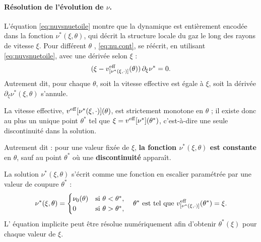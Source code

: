 \paragraph{Résolution de l'évolution de $\nu$.} L'équation \eqref{eq:nuvsnuetoile} montre que la dynamique est  entièrement encodée dans la fonction $\nu^*(\xi,\theta)$, qui décrit la structure locale du gaz le long des rayons de vitesse $\xi$. Pour différent  $\theta$ , \eqref{eq:nu.cont},  se réécrit, en utilisant \eqref{eq:nuvsnuetoile},   avec une dérivée selon $\xi$ : 
\begin{equation}
	( \xi - v^{\rm eff}_{[\nu^\ast(\xi,\cdot )  ]}(\theta) )\, \partial_\xi \nu^\ast  = 0 .	
\end{equation}
Autrement dit, pour chaque $\theta$, soit la vitesse effective est égale à $\xi$, soit la dérivée $\partial_\xi \nu^\ast(\xi,\theta)$ s'annule.

\medskip

La vitesse effective, $v^{\rm eff}{[\nu^\ast(\xi , \cdot ) ]}(\theta)$, est strictement monotone en $\theta$ ; il existe donc au plus un unique point $\theta^\ast$ tel que $\xi = v^{\rm eff}{[\nu^\ast]}(\theta^\ast)$, c’est-à-dire une seule discontinuité dans la solution.

\smallskip

Autrement dit : pour une valeur fixée de $\xi$, {\bf la fonction $\nu^\ast(\xi,\theta)$ est constante} en $\theta$, sauf au point $\theta^*$ où une {\bf discontinuité} apparaît.


\medskip

La solution $\nu^*(\xi,\theta)$ s’écrit comme une fonction en escalier paramétrée par une valeur de coupure $\theta^*$ :
\begin{equation}
    \label{eq:nuetoile}
    \nu^*(\xi,\theta) = 
    \begin{cases}
        \nu_0(\theta) & \text{si } \theta < \theta^*, \\
        0 & \text{si } \theta > \theta^*,
    \end{cases}
    \quad \text{$\theta^\ast$ est tel que } v^{\rm eff}_{[\nu^*(\xi,\cdot)]}(\theta^*) = \xi.
\end{equation}
L' équation implicite peut être résolue numériquement afin d'obtenir $\theta^\ast(\xi)$ pour chaque valeur de $\xi$. 

